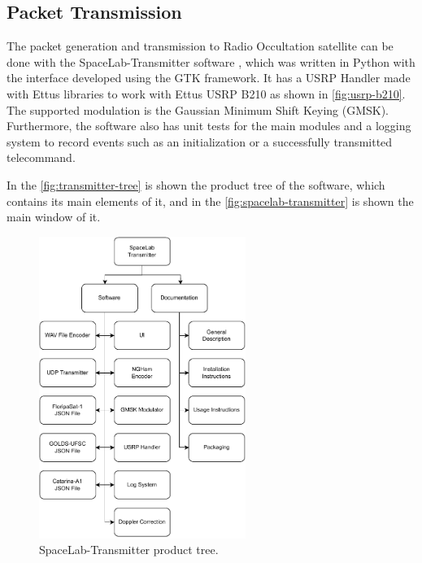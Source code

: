 \subsection{Packet Transmission}

The packet generation and transmission to Radio Occultation satellite can be done with the SpaceLab-Transmitter software \cite{spacelab-transmitter}, which was written in Python with the interface developed using the GTK framework. It has a USRP Handler made with Ettus libraries to work with Ettus USRP B210 as shown in \autoref{fig:usrp-b210}. The supported modulation is the Gaussian Minimum Shift Keying (GMSK). Furthermore, the software also has unit tests for the main modules and a logging system to record events such as an initialization or a successfully transmitted telecommand.

In the \autoref{fig:transmitter-tree} is shown the product tree of the software, which contains its main elements of it, and in the \autoref{fig:spacelab-transmitter} is shown the main window of it.

\begin{figure}[!ht]
    \begin{center}
        \includegraphics[width=0.6\textwidth]{figures/transmitter_tree.pdf}
        \caption{SpaceLab-Transmitter product tree.}
        \label{fig:transmitter-tree}
    \end{center}
\end{figure}

